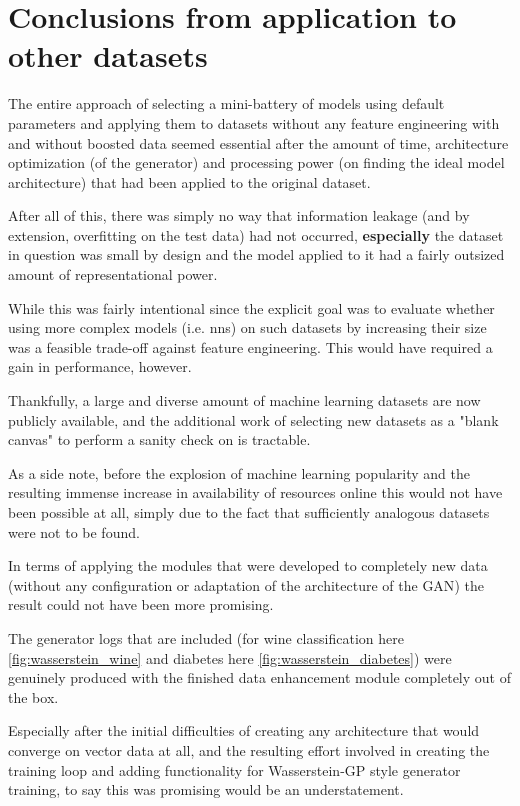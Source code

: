 \pagebreak

\section{Conclusions from application to other datasets}

The entire approach of selecting a mini-battery of models using default parameters and applying them to datasets without any feature engineering with and without boosted data seemed essential after the amount of time, architecture optimization (of the generator) and processing power (on finding the ideal model architecture) that had been applied to the original dataset.

After all of this, there was simply no way that information leakage (and by extension, overfitting on the test data) had not occurred, \textbf{especially} the dataset in question was small by design and the model applied to it had a fairly outsized amount of representational power. 

While this was fairly intentional since the explicit goal was to evaluate whether using more complex models (i.e. \acp{nn}) on such datasets by increasing their size was a feasible trade-off against feature engineering. This would have required a gain in performance, however.

Thankfully, a large and diverse amount of machine learning datasets are now publicly available, and the additional work of selecting new datasets as a "blank canvas" to perform a sanity check on is tractable. 

As a side note, before the explosion of machine learning popularity and the resulting immense increase in availability of resources online this would not have been possible at all, simply due to the fact that sufficiently analogous datasets were not to be found.

\pagebreak

In terms of applying the modules that were developed to completely new data (without any configuration or adaptation of the architecture of the \ac{GAN}) the result could not have been more promising. 

The generator logs that are included (for wine classification here \ref{fig:wasserstein_wine} and diabetes here \ref{fig:wasserstein_diabetes}) were genuinely produced with the finished data enhancement module completely out of the box. 

Especially after the initial difficulties of creating any architecture that would converge on vector data at all, and the resulting effort involved in creating the training loop and adding functionality for Wasserstein-GP style generator training, to say this was promising would be an understatement.

